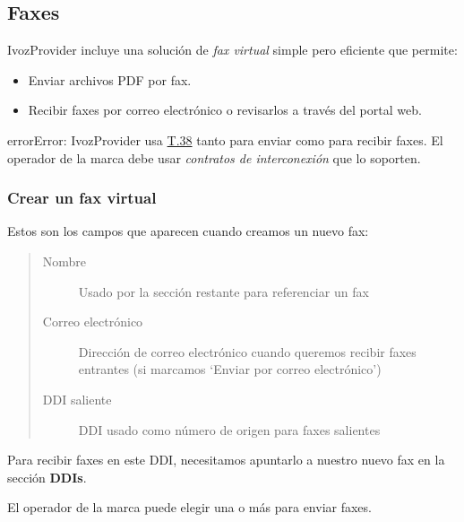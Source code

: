 \documentclass[letterpaper,10pt,spanish]{sphinxmanual}
\begin{document}
\subsection{Faxes}
\label{administration_portal/client/residential/faxes:faxes}\label{administration_portal/client/residential/faxes::doc}
IvozProvider incluye una solución de \emph{fax virtual} simple pero eficiente que permite:
\begin{itemize}
\item {} 
Enviar archivos PDF por fax.

\item {} 
Recibir faxes por correo electrónico o revisarlos a través del portal web.

\end{itemize}

\begin{notice}{error}{Error:}
IvozProvider usa \href{http://www.voip-info.org/wiki/view/T.38}{T.38} tanto para enviar como para recibir faxes. El operador de la marca debe usar \emph{contratos de interconexión} que lo soporten.
\end{notice}


\subsubsection{Crear un fax virtual}
\label{administration_portal/client/residential/faxes:creating-a-virtual-fax}
Estos son los campos que aparecen cuando creamos un nuevo fax:
\begin{quote}
\begin{description}
\item[{Nombre}] \leavevmode
Usado por la sección restante para referenciar un fax

\item[{Correo electrónico}] \leavevmode
Dirección de correo electrónico cuando queremos recibir faxes entrantes (si marcamos `Enviar por correo electrónico')

\item[{DDI saliente}] \leavevmode
DDI usado como número de origen para faxes salientes

\end{description}
\end{quote}

Para recibir faxes en este DDI, necesitamos apuntarlo a nuestro nuevo fax en la sección \textbf{DDIs}.

El operador de la marca puede elegir una o más {\hyperref[administration_portal/brand/routing/outgoing_routings:outgoing\string-routings]{}} para enviar faxes.
\end{document}
